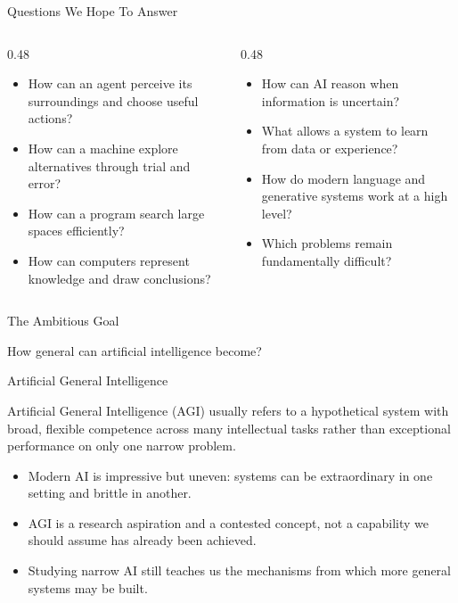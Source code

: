 \documentclass[aspectratio=169]{beamer}
\begin{document}
\begin{frame}[shrink=3]{Questions We Hope To Answer}
  \begin{columns}[T,onlytextwidth]
    \begin{column}{0.48\textwidth}
      \begin{itemize}
        \item How can an agent perceive its surroundings and choose useful actions?
        \item How can a machine explore alternatives through trial and error?
        \item How can a program search large spaces efficiently?
        \item How can computers represent knowledge and draw conclusions?
      \end{itemize}
    \end{column}
    \begin{column}{0.48\textwidth}
      \begin{itemize}
        \item How can AI reason when information is uncertain?
        \item What allows a system to learn from data or experience?
        \item How do modern language and generative systems work at a high level?
        \item Which problems remain fundamentally difficult?
      \end{itemize}
    \end{column}
  \end{columns}
\end{frame}

\begin{frame}{The Ambitious Goal}
  \begin{center}
    {\Huge How general can artificial intelligence become?}
  \end{center}
\end{frame}

\begin{frame}{Artificial General Intelligence}
  \begin{cpdefinition}
    Artificial General Intelligence (AGI) usually refers to a hypothetical system with broad, flexible competence across many intellectual tasks rather than exceptional performance on only one narrow problem.
  \end{cpdefinition}
  \vspace{0.14in}
  \begin{itemize}
    \item Modern AI is impressive but uneven: systems can be extraordinary in one setting and brittle in another.
    \item AGI is a research aspiration and a contested concept, not a capability we should assume has already been achieved.
    \item Studying narrow AI still teaches us the mechanisms from which more general systems may be built.
  \end{itemize}
\end{frame}
\end{document}
